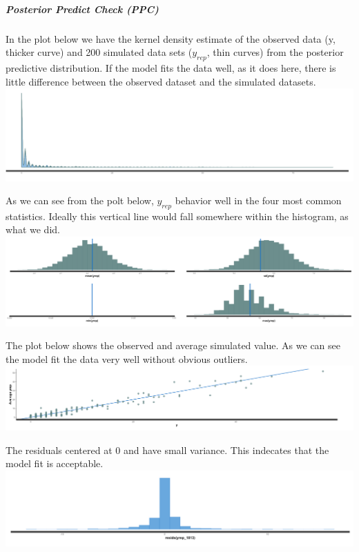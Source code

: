 \documentclass[]{tufte-handout}
\begin{document}
\hypertarget{posterior-predict-check-ppc}{%
\subparagraph{Posterior Predict Check
(PPC)}\label{posterior-predict-check-ppc}}

In the plot below we have the kernel density estimate of the observed
data (y, thicker curve) and 200 simulated data sets (\(y_{rep}\), thin
curves) from the posterior predictive distribution. If the model fits
the data well, as it does here, there is little difference between the
observed dataset and the simulated datasets.
\includegraphics{./pic/Distributions-of-observed-data-and-a-random-sample-of-replications.png}

As we can see from the polt below, \(y_{rep}\) behavior well in the four
most common statistics. Ideally this vertical line would fall somewhere
within the histogram, as what we did.
\includegraphics{./pic/Distributions-of-test-statistics.png .png}

The plot below shows the observed and average simulated value. As we can
see the model fit the data very well without obvious outliers.
\includegraphics{./pic/observe-vs-average-simulated-value.png}

The residuals centered at 0 and have small variance. This indecates that
the model fit is acceptable.
\includegraphics{./pic/residule-distribution.png}
\end{document}
